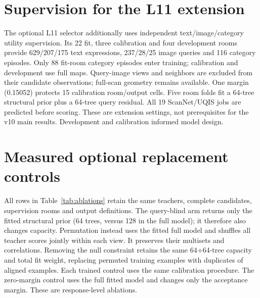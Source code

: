 \section{Supervision for the L11 extension}
The optional L11 selector additionally uses independent text/image/category
utility supervision. Its 22 fit, three calibration and four development rooms
provide 629/207/175 text expressions, 237/28/25 image queries and 116 category
episodes. Only 88 fit-room category episodes enter training; calibration and
development use full maps. Query-image views and neighbors are excluded from
their candidate observations; full-scan geometry remains available. One margin
(0.15052) protects 15 calibration room/output cells. Five room folds fit a
64-tree structural prior plus a 64-tree query residual. All 19 ScanNet/UQIS jobs
are predicted before scoring. These are extension settings, not prerequisites
for the v10 main results. Development and calibration informed model design.

\section{Measured optional replacement controls}

All rows in Table~\ref{tab:ablations} retain the same teachers, complete
candidates, supervision rooms and output definitions. The query-blind arm returns only the fitted structural prior (64 trees,
versus 128 in the full model); it therefore also changes capacity. Permutation
instead uses the fitted full model and
shuffles all teacher scores jointly within each view. It preserves their
multisets and correlations. Removing the null constraint retains the same
64+64-tree capacity and total fit weight, replacing permuted training examples
with duplicates of aligned examples. Each trained control uses the same
calibration procedure. The zero-margin control uses the full fitted model and
changes only the acceptance margin. These are response-level ablations.

\begin{table}[ht]
\centering\small\resizebox{\linewidth}{!}{}
\caption{Matched controls on all ten ScanNet rooms and 268 UQIS queries.
S19/15/10 are mesh mIoU. Repair/harm counts concern actual UQIS set IoU;
unchanged actual points are included in the denominator. This is one coupled
policy comparison, not a collection of per-benchmark best runs.}
\label{tab:ablations}
\end{table}

